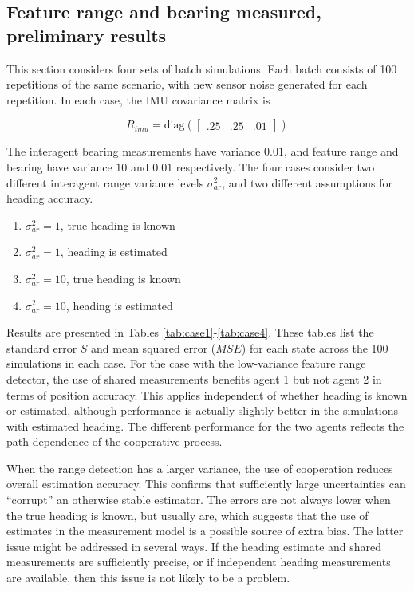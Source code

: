 \documentclass{aiaa-tc}
\begin{document}
\subsection{Feature range and bearing measured, preliminary results}

This section considers four sets of batch simulations. Each batch consists of 100 repetitions of the same scenario, with new sensor noise generated for each repetition. In each case, the IMU covariance matrix is 

\begin{equation}
R_{imu} = \mathrm{diag}(\begin{bmatrix}
.25 & .25 & .01
\end{bmatrix})
\end{equation}

The interagent bearing measurements have variance $0.01$, and feature range and bearing have variance $10$ and $0.01$ respectively. The four cases consider two different interagent range variance levels $\sigma_{ar}^2$, and two different assumptions for heading accuracy.

\begin{enumerate}
\item $\sigma_{ar}^2 = 1$, true heading is known
\item $\sigma_{ar}^2 = 1$, heading is estimated
\item $\sigma_{ar}^2 = 10$, true heading is known
\item $\sigma_{ar}^2 = 10$, heading is estimated
\end{enumerate}

Results are presented in Tables \ref{tab:case1}-\ref{tab:case4}. These tables list the standard error $S$ and mean squared error ($MSE$) for each state across the 100 simulations in each case. For the case with the low-variance feature range detector, the use of shared measurements benefits agent 1 but not agent 2 in terms of position accuracy. This applies independent of whether heading is known or estimated, although performance is actually slightly better in the simulations with estimated heading. The different performance for the two agents reflects the path-dependence of the cooperative process.

When the range detection has a larger variance, the use of cooperation reduces overall estimation accuracy. This confirms that sufficiently large uncertainties can ``corrupt'' an otherwise stable estimator. The errors are not always lower when the true heading is known, but usually are, which suggests that the use of estimates in the measurement model is a possible source of extra bias. The latter issue might be addressed in several ways. If the heading estimate and shared measurements are sufficiently precise, or if independent heading measurements are available, then this issue is not likely to be a problem.
\end{document}
